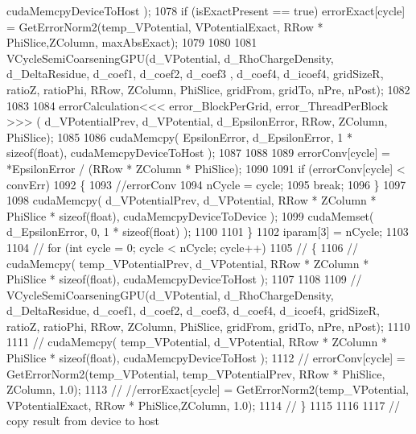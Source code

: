 \begin{DoxyCode}
      cudaMemcpyDeviceToHost );
1078         \textcolor{keywordflow}{if} (isExactPresent == \textcolor{keyword}{true}) errorExact[cycle] = GetErrorNorm2(temp\_VPotential, VPotentialExact, 
      RRow * PhiSlice,ZColumn, maxAbsExact); 
1079 
1080 
1081         VCycleSemiCoarseningGPU(d\_VPotential, d\_RhoChargeDensity, d\_DeltaResidue, d\_coef1, d\_coef2, d\_coef3
      , d\_coef4, d\_icoef4, gridSizeR, ratioZ, ratioPhi, RRow, ZColumn, PhiSlice, gridFrom, gridTo, nPre, nPost);
1082         
1083 
1084         errorCalculation<<< error\_BlockPerGrid, error\_ThreadPerBlock >>> ( d\_VPotentialPrev, d\_VPotential, 
      d\_EpsilonError, RRow, ZColumn, PhiSlice);
1085 
1086         cudaMemcpy( EpsilonError, d\_EpsilonError, 1 * \textcolor{keyword}{sizeof}(\textcolor{keywordtype}{float}), cudaMemcpyDeviceToHost );      
1087         
1088 
1089         errorConv[cycle] = *EpsilonError  / (RRow * ZColumn * PhiSlice);
1090 
1091         \textcolor{keywordflow}{if} (errorConv[cycle] < convErr)
1092         \{
1093             \textcolor{comment}{//errorConv}
1094             nCycle = cycle;
1095             \textcolor{keywordflow}{break};
1096         \}
1097 
1098         cudaMemcpy( d\_VPotentialPrev, d\_VPotential, RRow * ZColumn * PhiSlice * \textcolor{keyword}{sizeof}(\textcolor{keywordtype}{float}), 
      cudaMemcpyDeviceToDevice );
1099         cudaMemset( d\_EpsilonError, 0, 1 * \textcolor{keyword}{sizeof}(\textcolor{keywordtype}{float}) );
1100 
1101     \}
1102     iparam[3] = nCycle;
1103 
1104 \textcolor{comment}{//  for (int cycle = 0; cycle < nCycle; cycle++)}
1105 \textcolor{comment}{//  \{}
1106 \textcolor{comment}{//      cudaMemcpy( temp\_VPotentialPrev, d\_VPotential, RRow * ZColumn * PhiSlice * sizeof(float),
       cudaMemcpyDeviceToHost );}
1107 
1108     
1109 \textcolor{comment}{//      VCycleSemiCoarseningGPU(d\_VPotential, d\_RhoChargeDensity, d\_DeltaResidue, d\_coef1, d\_coef2,
       d\_coef3, d\_coef4, d\_icoef4, gridSizeR, ratioZ, ratioPhi, RRow, ZColumn, PhiSlice, gridFrom, gridTo, nPre, nPost);}
1110         
1111 \textcolor{comment}{//      cudaMemcpy( temp\_VPotential, d\_VPotential, RRow * ZColumn * PhiSlice * sizeof(float),
       cudaMemcpyDeviceToHost );}
1112 \textcolor{comment}{//      errorConv[cycle] = GetErrorNorm2(temp\_VPotential, temp\_VPotentialPrev, RRow * PhiSlice, ZColumn,
       1.0); }
1113 \textcolor{comment}{//      //errorExact[cycle] = GetErrorNorm2(temp\_VPotential, VPotentialExact, RRow * PhiSlice,ZColumn,
       1.0); }
1114 \textcolor{comment}{//  \}}
1115 
1116 
1117     \textcolor{comment}{// copy result from device to host}

\end{DoxyCode}
